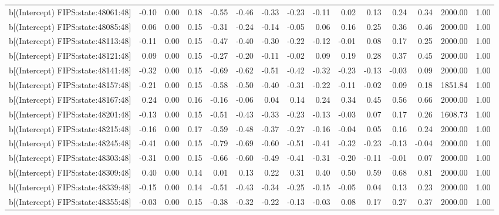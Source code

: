 \begin{table}[ht]
\begin{tabular}{rrrrrrrrrrrrrrr}
  b[(Intercept) FIPS:state:48061:48] & -0.10 & 0.00 & 0.18 & -0.55 & -0.46 & -0.33 & -0.23 & -0.11 & 0.02 & 0.13 & 0.24 & 0.34 & 2000.00 & 1.00 \\ 
  b[(Intercept) FIPS:state:48085:48] & 0.06 & 0.00 & 0.15 & -0.31 & -0.24 & -0.14 & -0.05 & 0.06 & 0.16 & 0.25 & 0.36 & 0.46 & 2000.00 & 1.00 \\ 
  b[(Intercept) FIPS:state:48113:48] & -0.11 & 0.00 & 0.15 & -0.47 & -0.40 & -0.30 & -0.22 & -0.12 & -0.01 & 0.08 & 0.17 & 0.25 & 2000.00 & 1.00 \\ 
  b[(Intercept) FIPS:state:48121:48] & 0.09 & 0.00 & 0.15 & -0.27 & -0.20 & -0.11 & -0.02 & 0.09 & 0.19 & 0.28 & 0.37 & 0.45 & 2000.00 & 1.00 \\ 
  b[(Intercept) FIPS:state:48141:48] & -0.32 & 0.00 & 0.15 & -0.69 & -0.62 & -0.51 & -0.42 & -0.32 & -0.23 & -0.13 & -0.03 & 0.09 & 2000.00 & 1.00 \\ 
  b[(Intercept) FIPS:state:48157:48] & -0.21 & 0.00 & 0.15 & -0.58 & -0.50 & -0.40 & -0.31 & -0.22 & -0.11 & -0.02 & 0.09 & 0.18 & 1851.84 & 1.00 \\ 
  b[(Intercept) FIPS:state:48167:48] & 0.24 & 0.00 & 0.16 & -0.16 & -0.06 & 0.04 & 0.14 & 0.24 & 0.34 & 0.45 & 0.56 & 0.66 & 2000.00 & 1.00 \\ 
  b[(Intercept) FIPS:state:48201:48] & -0.13 & 0.00 & 0.15 & -0.51 & -0.43 & -0.33 & -0.23 & -0.13 & -0.03 & 0.07 & 0.17 & 0.26 & 1608.73 & 1.00 \\ 
  b[(Intercept) FIPS:state:48215:48] & -0.16 & 0.00 & 0.17 & -0.59 & -0.48 & -0.37 & -0.27 & -0.16 & -0.04 & 0.05 & 0.16 & 0.24 & 2000.00 & 1.00 \\ 
  b[(Intercept) FIPS:state:48245:48] & -0.41 & 0.00 & 0.15 & -0.79 & -0.69 & -0.60 & -0.51 & -0.41 & -0.32 & -0.23 & -0.13 & -0.04 & 2000.00 & 1.00 \\ 
  b[(Intercept) FIPS:state:48303:48] & -0.31 & 0.00 & 0.15 & -0.66 & -0.60 & -0.49 & -0.41 & -0.31 & -0.20 & -0.11 & -0.01 & 0.07 & 2000.00 & 1.00 \\ 
  b[(Intercept) FIPS:state:48309:48] & 0.40 & 0.00 & 0.14 & 0.01 & 0.13 & 0.22 & 0.31 & 0.40 & 0.50 & 0.59 & 0.68 & 0.81 & 2000.00 & 1.00 \\ 
  b[(Intercept) FIPS:state:48339:48] & -0.15 & 0.00 & 0.14 & -0.51 & -0.43 & -0.34 & -0.25 & -0.15 & -0.05 & 0.04 & 0.13 & 0.23 & 2000.00 & 1.00 \\ 
  b[(Intercept) FIPS:state:48355:48] & -0.03 & 0.00 & 0.15 & -0.38 & -0.32 & -0.22 & -0.13 & -0.03 & 0.08 & 0.17 & 0.27 & 0.37 & 2000.00 & 1.00 \\ 

\end{tabular}
\end{table}
